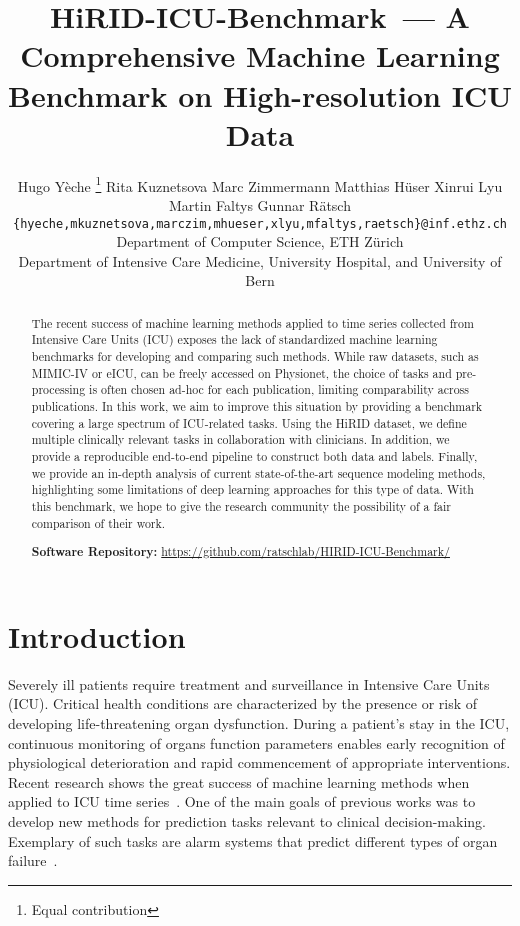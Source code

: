 \documentclass{article}
\title{HiRID-ICU-Benchmark~--- A Comprehensive Machine Learning Benchmark on High-resolution ICU Data}
\author{
    Hugo Yèche  \thanks{Equal contribution} \And Rita Kuznetsova  \footnotemark[1] \And  Marc Zimmermann  \AND Matthias Hüser  \And Xinrui Lyu  \And  Martin Faltys  \And Gunnar Rätsch  \And
    \texttt{\{hyeche,mkuznetsova,marczim,mhueser,xlyu,mfaltys,raetsch\}@inf.ethz.ch}\\
    
    \small{Department of Computer Science, ETH Zürich }\\
    \small{ Department of Intensive Care Medicine, University Hospital, and University of Bern}\\
}
\begin{document}
\maketitle



\begin{abstract}
The recent success of machine learning methods applied to time series collected from Intensive Care Units (ICU) exposes the lack of standardized machine learning benchmarks for developing and comparing such methods. While raw datasets, such as MIMIC-IV or eICU, can be freely accessed on Physionet, the choice of tasks and pre-processing is often chosen ad-hoc for each publication, limiting comparability across publications. In this work, we aim to improve this situation by providing a  benchmark covering a large spectrum of ICU-related tasks. Using the HiRID dataset, we define multiple clinically relevant tasks in collaboration with clinicians.  In addition, we provide a reproducible end-to-end pipeline to construct both data and labels. Finally, we provide an in-depth analysis of current state-of-the-art sequence modeling methods, highlighting some limitations of deep learning approaches for this type of data. With this benchmark, we hope to give the research community the possibility of a fair comparison of their work.



\smallskip
\small
\textbf{Software Repository: }\url{https://github.com/ratschlab/HIRID-ICU-Benchmark/}
\end{abstract} \section{Introduction}\label{intro}
Severely ill patients require treatment and surveillance in Intensive Care Units (ICU). Critical health conditions are characterized by the presence or risk of developing life-threatening organ dysfunction. During a patient's stay in the ICU, continuous monitoring of organs function parameters enables early recognition of physiological deterioration and rapid commencement of appropriate interventions. Recent research shows the great success of machine learning methods when applied to ICU time series~\cite{ncle, horn2020set}. One of the main goals of previous works was to develop new methods for prediction tasks relevant to clinical decision-making. Exemplary of such tasks are alarm systems that predict different types of organ failure~\cite{hyland2020early,tomavsev2019clinically}.
\end{document}
